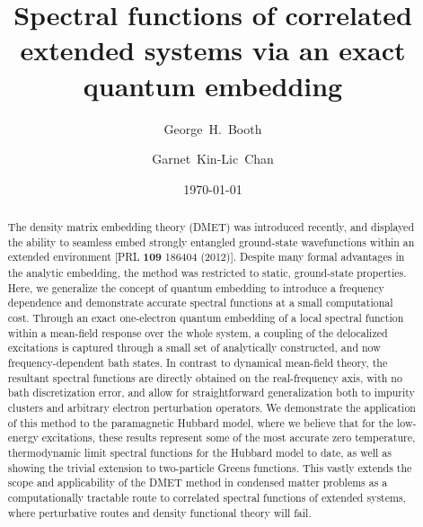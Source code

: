 \documentclass[aps,showpacs,twocolumn,nobibnotes]{revtex4}
\begin{document}
\title{Spectral functions of correlated extended systems via an exact quantum embedding}
\author{George~H.~Booth}
\author{Garnet~Kin-Lic~Chan}  

\begin{abstract}
The density matrix embedding theory (DMET) was introduced recently, and displayed the ability to seamless embed strongly entangled ground-state wavefunctions
within an extended environment [PRL {\bf 109} 186404 (2012)].
Despite many formal advantages in the analytic embedding, the method was restricted to static, ground-state properties.
Here, we generalize the concept of quantum embedding to introduce a frequency dependence and demonstrate accurate spectral functions at a small
computational cost. Through an exact one-electron quantum embedding of a local spectral function within a mean-field response over the whole system, 
a coupling of the delocalized excitations is captured through a small set of 
analytically constructed, and now frequency-dependent bath states. In contrast to dynamical mean-field theory, the resultant 
spectral functions are directly obtained on the real-frequency axis, with no bath discretization error, and allow for straightforward generalization both 
to impurity clusters and arbitrary electron perturbation operators. We demonstrate
the application of this method to the paramagnetic Hubbard model, where we believe that for the low-energy excitations, these results represent some of the most accurate 
zero temperature, thermodynamic limit spectral functions for the Hubbard model to date, as well as showing the trivial extension to two-particle Greens functions. 
This vastly extends the scope and applicability 
of the DMET method in condensed matter problems as a computationally tractable route to correlated spectral functions of extended systems, where perturbative routes and density functional theory will fail.
\end{abstract}
\date{\today}
\maketitle
\end{document}

